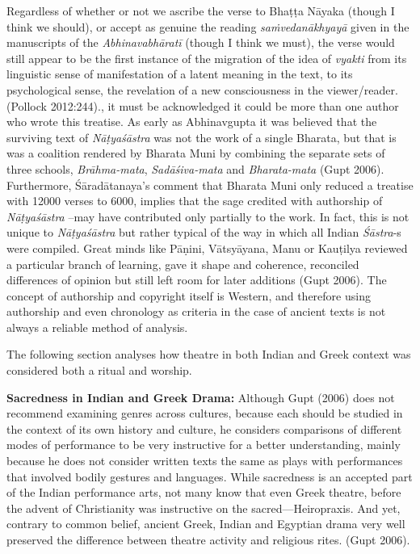 {Regardless of whether or not we ascribe the verse to Bhaṭṭa Nāyaka (though I think we should), or accept as genuine the reading \textsl{saṁvedanākhyayā} given in the manuscripts of the \textsl{Abhinavabhāratī} (though I think we must), the verse would still appear to be the first instance of the migration of the idea of \textsl{vyakti} from its linguistic sense of manifestation of a latent meaning in the text, to its psychological sense, the revelation of a new consciousness in the viewer/reader. (Pollock 2012:244).}, it must be acknowledged it could be more than one author who wrote this treatise. As early as Abhinavgupta it was believed that the surviving text of \textsl{Nāṭyaśāstra} was not the work of a single Bharata, but that is was a coalition rendered by Bharata Muni by combining the separate sets of three schools, \textsl{Brāhma-mata}, \textsl{Sadāśiva-mata} and \textsl{Bharata-mata} (Gupt 2006). Furthermore, Śāradātanaya’s comment that Bharata Muni only reduced a treatise with 12000 verses to 6000, implies that the sage credited with authorship of \textsl{Nāṭyaśāstra} --may have contributed only partially to the work. In fact, this is not unique to \textsl{Nāṭyaśāstra} but rather typical of the way in which all Indian \textsl{Śāstra}-s were compiled. Great minds like Pāṇini, Vātsyāyana, Manu or Kauṭilya reviewed a particular branch of learning, gave it shape and coherence, reconciled differences of opinion but still left room for later additions (Gupt 2006). The concept of authorship and copyright itself is Western, and therefore using authorship and even chronology as criteria in the case of ancient texts is not always a reliable method of analysis. 

The following section analyses how theatre in both Indian and Greek context was considered both a ritual and worship. 

\textbf{Sacredness in Indian and Greek Drama:} Although Gupt (2006) does not recommend examining genres across cultures, because each should be studied in the context of its own history and culture, he considers comparisons of different modes of performance to be very instructive for a better understanding, mainly because he does not consider written texts the same as plays with performances that involved bodily gestures and languages. While sacredness is an accepted part of the Indian performance arts, not many know that even Greek theatre, before the advent of Christianity was instructive on the sacred---Heiropraxis. And yet, contrary to common belief, ancient Greek, Indian and Egyptian drama very well preserved the difference between theatre activity and religious rites. (Gupt 2006).

